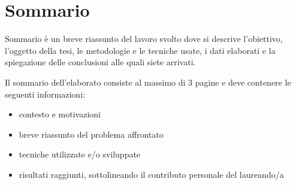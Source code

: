 \chapter*{Sommario} %
\label{sommario}

  Sommario è un breve riassunto del lavoro svolto dove si descrive l'obiettivo, l'oggetto della tesi, le
metodologie e le tecniche usate, i dati elaborati e la spiegazione delle conclusioni alle quali siete arrivati.

Il sommario dell’elaborato consiste al massimo di 3 pagine e deve contenere le seguenti informazioni:
\begin{itemize}
  \item contesto e motivazioni
  \item breve riassunto del problema affrontato
  \item tecniche utilizzate e/o sviluppate
  \item risultati raggiunti, sottolineando il contributo personale del laureando/a
\end{itemize}

